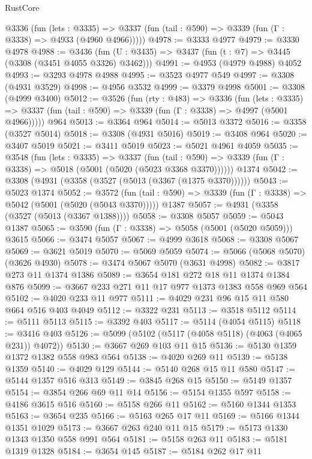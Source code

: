 \begin{lexlean}{RustCore}
\begin{coremodule}
    @3336
      (fun (lets : @3335) =>
      @3337 (fun (tail : @590) => @3339 (fun (Γ : @3338) => @4933 (@4960 @4966)))))
@4978 := @3333 @4977
@4979 := @3330 @4978
@4988 := @3436 (fun (U : @3435) => @3437 (fun (t : @7) => @3445 (@3308 (@3451 @4055 @3326) @3462)))
@4991 := @4953 (@4979 @4988) @4052
@4993 := @3293 @4978 @4988
@4995 := @3523 @4977 @549
@4997 := @3308 (@4931 @3529)
@4998 := @4956 @3532
@4999 := @3379 @4998
@5001 := @3308 (@4999 @3400)
@5012 := @3526
    (fun (rty : @483) =>
    @3336
      (fun (lets : @3335) =>
      @3337 (fun (tail : @590) => @3339 (fun (Γ : @3338) => @4997 (@5001 @4966)))))
    @964
@5013 := @3364 @964
@5014 := @5013 @3372
@5016 := @3358 (@3527 @5014)
@5018 := @3308 (@4931 @5016)
@5019 := @3408 @964
@5020 := @3407 @5019
@5021 := @3411 @5019
@5023 := @5021 @4961 @4059
@5035 := @3548
    (fun (lets : @3335) =>
    @3337
      (fun (tail : @590) => @3339 (fun (Γ : @3338) => @5018 (@5001 (@5020 (@5023 @3368 @3370))))))
    @1374
@5042 := @3308 (@4931 (@3358 (@3527 (@5013 (@3367 (@1375 @3370))))))
@5043 := @5023 @1374
@5052 := @3572
    (fun (tail : @590) => @3339 (fun (Γ : @3338) => @5042 (@5001 (@5020 (@5043 @3370)))))
    @1387
@5057 := @4931 (@3358 (@3527 (@5013 (@3367 @1388))))
@5058 := @3308 @5057
@5059 := @5043 @1387
@5065 := @3590 (fun (Γ : @3338) => @5058 (@5001 (@5020 @5059))) @3615
@5066 := @3474 @5057
@5067 := @4999 @3618
@5068 := @3308 @5067
@5069 := @3621 @5019
@5070 := @5069 @5059
@5074 := @5066 (@5068 @5070) (@3626 @4930)
@5078 := @3474 @5067 @5070 (@3631 @4998)
@5082 := @3817 @273 @11 @1374 @1386
@5089 := @3654 @181 @272 @18 @11 @1374 @1384 @876
@5099 := @3667 @233 @271 @11 @17 @977 @1373 @1383 @558 @969 @564
@5102 := @4020 @233 @11 @977
@5111 := @4029 @231 @96 @15 @11 @580 @664 @516 @403 @4049
@5112 := @3322 @231
@5113 := @3518 @5112
@5114 := @5111 @5113
@5115 := @3392 @403
@5117 := @5114 (@4054 @5115)
@5118 := @3416 @403
@5126 := @5099 (@5102 (@5117 (@4058 @5118) (@4063 (@4065 @231)) @4072))
@5130 := @3667 @269 @103 @11 @15
@5136 := @5130 @1359 @1372 @1382 @558 @983 @564
@5138 := @4020 @269 @11
@5139 := @5138 @1359
@5140 := @4029 @129
@5144 := @5140 @268 @15 @11 @580
@5147 := @5144 @1357 @516 @313
@5149 := @3845 @268 @15
@5150 := @5149 @1357
@5154 := @3854 @266 @69 @11 @14
@5156 := @5154 @1355 @597
@5158 := @4186 @3615 @516
@5160 := @5158 @266 @11
@5162 := @5160 @1344 @1353
@5163 := @3654 @235
@5166 := @5163 @265 @17 @11
@5169 := @5166 @1344 @1351 @1029
@5173 := @3667 @263 @240 @11 @15
@5179 := @5173 @1330 @1343 @1350 @558 @991 @564
@5181 := @5158 @263 @11
@5183 := @5181 @1319 @1328
@5184 := @3654 @145
@5187 := @5184 @262 @17 @11

\end{coremodule}
\end{lexlean}
